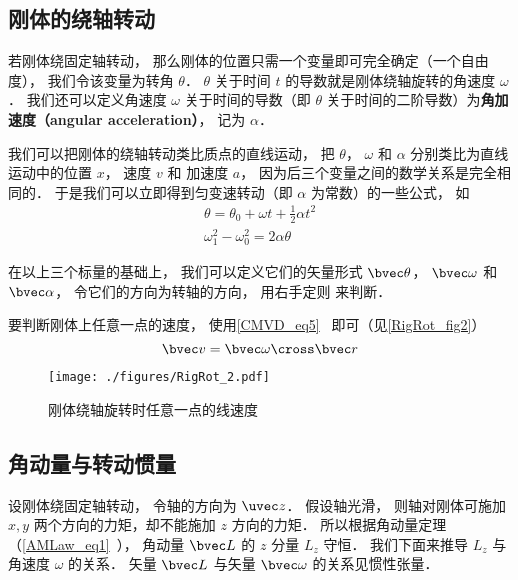 

\subsection{刚体的绕轴转动}
若刚体绕固定轴转动， 那么刚体的位置只需一个变量即可完全确定（一个自由度）， 我们令该变量为转角 $\theta$． $\theta$ 关于时间 $t$ 的导数就是刚体绕轴旋转的角速度 $\omega$． 我们还可以定义角速度 $\omega$ 关于时间的导数（即 $\theta$ 关于时间的二阶导数）为\textbf{角加速度（angular acceleration）}， 记为 $\alpha$．

我们可以把刚体的绕轴转动类比质点的直线运动， 把 $\theta$， $\omega$ 和 $\alpha$ 分别类比为直线运动中的位置 $x$， 速度 $v$ 和 加速度 $a$， 因为后三个变量之间的数学关系是完全相同的． 于是我们可以立即得到匀变速转动（即 $\alpha$ 为常数）的一些公式， 如
\begin{gather}
\theta = \theta_0 + \omega t + \frac12 \alpha t^2\\
\omega_1^2 - \omega_0^2 = 2\alpha \theta
\end{gather}

在以上三个标量的基础上， 我们可以定义它们的矢量形式 $\bvec \theta$， $\bvec \omega$ 和 $\bvec \alpha$， 令它们的方向为转轴的方向， 用右手定则 来判断．

要判断刚体上任意一点的速度， 使用\autoref{CMVD_eq5}~ 即可（见\autoref{RigRot_fig2}）
\begin{equation}
\bvec v = \bvec \omega \cross \bvec r
\end{equation}

\begin{figure}[ht]
\centering
\texttt{[image: ./figures/RigRot\_2.pdf]}
\caption{刚体绕轴旋转时任意一点的线速度} \label{RigRot_fig2}
\end{figure}

\subsection{角动量与转动惯量}

设刚体绕固定轴转动， 令轴的方向为 $\uvec z$． 假设轴光滑， 则轴对刚体可施加 $x, y$ 两个方向的力矩，却不能施加 $z$ 方向的力矩． 所以根据角动量定理（\autoref{AMLaw_eq1}~）， 角动量 $\bvec L$ 的 $z$ 分量 $L_z$ 守恒． 我们下面来推导 $L_z$ 与角速度 $\omega$ 的关系． 矢量 $\bvec L$ 与矢量 $\bvec \omega$ 的关系见惯性张量．


